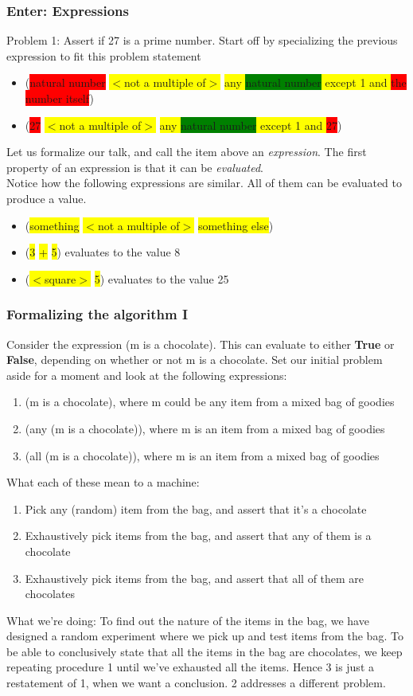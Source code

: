 {
  \frametitle{Enter: Expressions}
  Problem 1: Assert if 27 is a prime number. Start off by specializing the previous expression to fit this problem statement
  \begin{itemize}
    \item \scriptsize{(\colorbox{yellow}{\colorbox{red}{natural number}} \colorbox{yellow}{$<$not a multiple of$>$} \colorbox{yellow}{any \colorbox{green}{natural number} except 1 and \colorbox{red}{the number itself}})}\normalsize
    \item (\colorbox{yellow}{\colorbox{red}{27}} \colorbox{yellow}{$<$not a multiple of$>$} \colorbox{yellow}{any \colorbox{green}{natural number} except 1 and \colorbox{red}{27}})
  \end{itemize}
  Let us formalize our talk, and call the item above an \textit{expression}. The first property of an expression is that it can be \textit{evaluated}.\\
  Notice how the following expressions are similar. All of them can be evaluated to produce a value.
  \begin{itemize}
    \item (\colorbox{yellow}{something} \colorbox{yellow}{$<$not a multiple of$>$} \colorbox{yellow}{something else})
    \item (\colorbox{yellow}{3} \colorbox{yellow}{+} \colorbox{yellow}{5}) evaluates to the value 8
    \item (\colorbox{yellow}{$<$square$>$} \colorbox{yellow}{5}) evaluates to the value 25
  \end{itemize}
}
\frame
{
  \frametitle{Formalizing the algorithm I}
  Consider the expression (m is a chocolate). This can evaluate to either \textbf{True} or \textbf{False}, depending on whether or not m is a chocolate. Set our initial problem aside for a moment and look at the following expressions:
  \begin{enumerate}
    \item (m is a chocolate), where m could be any item from a mixed bag of goodies
    \item (any (m is a chocolate)), where m is an item from a mixed bag of goodies
    \item (all (m is a chocolate)), where m is an item from a mixed bag of goodies
  \end{enumerate}
  What each of these mean to a machine:
  \begin{enumerate}
    \item Pick any (random) item from the bag, and assert that it's a chocolate
    \item Exhaustively pick items from the bag, and assert that any of them is a chocolate
    \item Exhaustively pick items from the bag, and assert that all of them are chocolates
  \end{enumerate}
  What we're doing: To find out the nature of the items in the bag, we have designed a random experiment where we pick up and test items from the bag. To be able to conclusively state that all the items in the bag are chocolates, we keep repeating procedure 1 until we've exhausted all the items. Hence 3 is just a restatement of 1, when we want a conclusion. 2 addresses a different problem.
}
